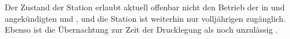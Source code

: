 \begin{newstuff}
    Der  Zustand der Station erlaubt aktuell offenbar nicht den Betrieb der in \cite{ctour} und \cite{cbasestarbasemanual} angekündigten  und , und die Station ist weiterhin nur volljährigen zugänglich. Ebenso ist die Übernachtung zur Zeit der Drucklegung als  noch unzulässig \cite[S. 58]{cbasebook}.
\end{newstuff}